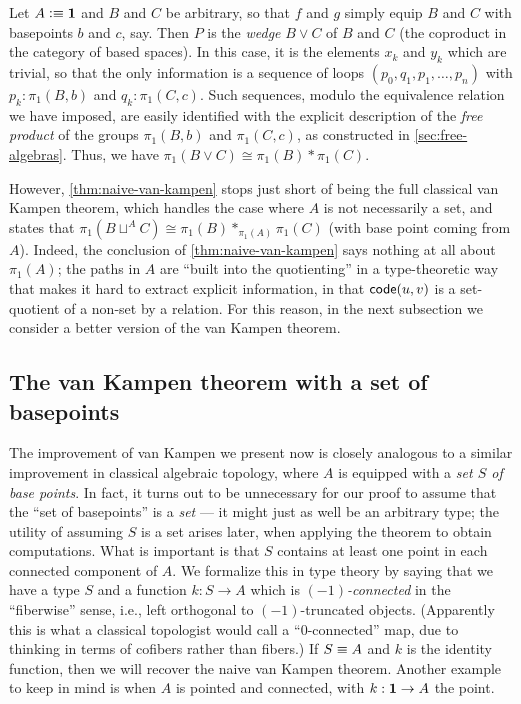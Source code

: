 \begin{eg}\label{eg:wedge}
  Let $A\vcentcolon\equiv\mathbf{1}$ and $B$ and $C$ be arbitrary, so that $f$ and $g$ simply equip $B$ and $C$ with basepoints $b$ and $c$, say.
  Then $P$ is the \emph{wedge} $B\vee C$ of $B$ and $C$ (the coproduct in the category of based spaces).
  In this case, it is the elements $x_k$ and $y_k$ which are trivial, so that the only information is a sequence of loops $(p_0,q_1,p_1,\dots,p_n)$ with $p_k:\pi_1(B,b)$ and $q_k:\pi_1(C,c)$.
  Such sequences, modulo the equivalence relation we have imposed, are easily identified with the explicit description of the \emph{free product} of the groups $\pi_1(B,b)$ and $\pi_1(C,c)$, as constructed in \autoref{sec:free-algebras}.
  Thus, we have $\pi_1(B\vee C) \cong \pi_1(B) * \pi_1(C)$.
\end{eg}

However, \autoref{thm:naive-van-kampen} stops just short of being the full classical van Kampen theorem, which handles
the case where $A$ is not necessarily a set, 
and states that $\pi_1(B\sqcup^A C) \cong \pi_1(B) *_{\pi_1(A)} \pi_1(C)$ (with base point coming from $A$).
Indeed, the conclusion of \autoref{thm:naive-van-kampen} says nothing at all about $\pi_1(A)$; the paths in $A$ are ``built into the quotienting'' in a type-theoretic way that makes it hard to extract explicit information, in that $\mathsf{code}(u,v)$ is a set-quotient of a non-set by a relation.
For this reason, in the next subsection we consider a better version of the van Kampen theorem.


\subsection{The van Kampen theorem with a set of basepoints}
\label{sec:better-vankampen}

The improvement of van Kampen we present now is closely analogous to a similar improvement in classical algebraic topology, where $A$ is equipped with a \emph{set $S$ of base points}.
In fact, it turns out to be unnecessary for our proof to assume that the ``set of basepoints'' is a \emph{set} --- it might just as well be an arbitrary type; the utility of assuming $S$ is a set arises later, when applying the theorem to obtain computations.
What is important is that $S$ contains at least one point in each connected component of $A$.
We formalize this in type theory by saying that we have a type $S$ and a function $k:S \to A$ which is \emph{$(-1)$-connected} in the ``fiberwise'' sense, i.e., left orthogonal to $(-1)$-truncated objects.
(Apparently this is what a classical topologist would call a ``$0$-connected'' map, due to thinking in terms of cofibers rather than fibers.)
If $S\equiv A$ and $k$ is the identity function, then we will recover the naive van Kampen theorem.
Another example to keep in mind is when $A$ is pointed and connected, with $k:\mathbf{1}\to A$ the point.

